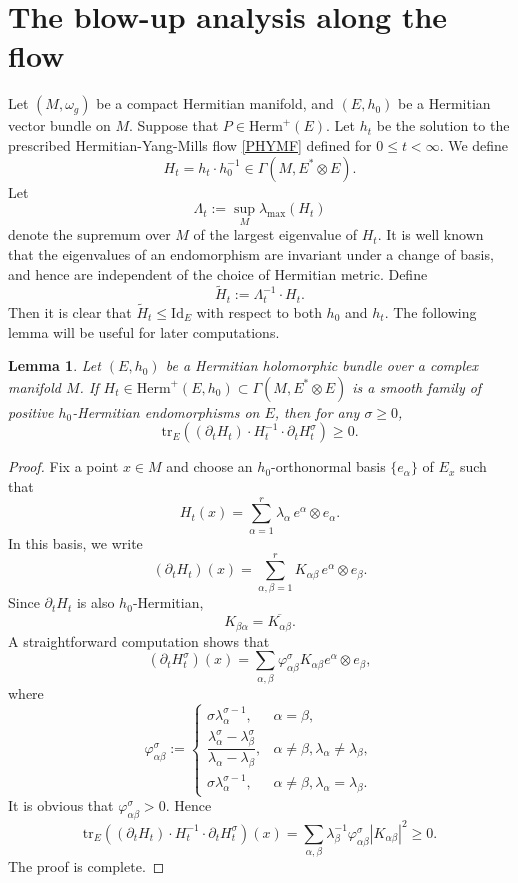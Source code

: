 \documentclass[12pt, reqno]{amsart}
\theoremstyle{plain}
\newtheorem{lemma}[thm]{Lemma}
\theoremstyle{definition}
\newcommand{\elemma}{\end{lemma}}
\newcommand{\blemma}{\begin{lemma}}
\renewcommand{\phi}{\varphi}
\newcommand{\beq}{\begin{equation}}
\newcommand{\eeq}{\end{equation}}
\renewcommand{\tilde}{\widetilde}
\newcommand{\ts}{\otimes}
\renewcommand{\>}{\rightarrow}
\renewcommand{\>}{\rightarrow}
\newcommand{\om}{\omega}
\renewcommand{\tilde}{\widetilde}
\newcommand{\tr}{\mathrm{tr}}
\numberwithin{equation}{section} %
\begin{document}
\baselineskip

\section{The blow-up analysis along the flow}


Let $(M,\om_g)$ be a compact Hermitian manifold, and $(E,h_0)$ be a Hermitian vector bundle on $M$. Suppose that $P\in \mathrm{Herm}^+(E)$.
Let $h_t$ be the solution to the prescribed Hermitian-Yang-Mills flow \eqref{PHYMF} defined for $0\leq t <\infty$.
We define
\beq
H_t=h_t\cdot h_0^{-1}\in\Gamma(M,E^*\ts E).
\eeq
Let  \beq \Lambda_t := \sup_M \lambda_{\max}(H_t)\eeq denote the supremum over $M$ of the largest eigenvalue of $H_t$. It is well known that the eigenvalues of an endomorphism are invariant under a change of basis, and hence are independent of the choice of Hermitian metric.   Define
\beq
\tilde H_t:=\Lambda_t^{-1}\cdot H_t.
\eeq
Then it is clear that $ \tilde H_t\leq \mathrm{Id}_E$ with respect  to both $h_0$ and $h_t$. The following lemma  will be useful for later computations.


\blemma \label{lem pointwise estimate}
Let $(E,h_0)$ be a Hermitian holomorphic  bundle over a complex manifold $M$.
If $H_t\in\mathrm{Herm}^+(E,h_0)\subset \Gamma(M,E^*\ts E)$ is a smooth family of positive $h_0$-Hermitian endomorphisms  on $E$, then for any $\sigma\geq 0$,
\beq
\tr_E\left( \left(\partial_tH_t\right)\cdot H_t^{-1} \cdot\partial_tH_t^\sigma\right) \geq 0.
\eeq
\elemma

\begin{proof}
Fix a point $x \in M$ and choose an $h_0$-orthonormal basis $\{e_\alpha\}$ of $E_x$ such that
\[
H_t(x) = \sum_{\alpha=1}^r \lambda_\alpha \, e^\alpha \otimes e_\alpha .
\]
In this basis, we write
\[
(\partial_t H_t)(x) = \sum_{\alpha,\beta=1}^r K_{\alpha\beta} \, e^\alpha \otimes e_\beta .
\]
    Since $\partial_tH_t$ is also $h_0$-Hermitian, $$K_{\beta\alpha}=\overline{K_{\alpha\beta}}.$$
    A straightforward computation shows that
    \beq
    \left(\partial_tH_t^\sigma\right)(x)=\sum_{\alpha,\beta}\phi^\sigma_{\alpha\beta}K_{\alpha\beta}e^\alpha\ts e_\beta,
    \eeq
    where \beq
    \phi^{\sigma}_{\alpha\beta}:=
    \begin{cases}
        \sigma \lambda_\alpha^{\sigma-1}, & \alpha=\beta,\\[3pt]
        \dfrac{\lambda_\alpha^\sigma-\lambda_\beta^\sigma}{\lambda_\alpha-\lambda_\beta}, &  \alpha\ne \beta, \lambda_\alpha\neq \lambda_\beta ,\\[3pt]
        \sigma \lambda_\alpha^{\sigma-1}, &  \alpha\ne \beta, \lambda_\alpha= \lambda_\beta.
    \end{cases} \label{phisigma}
    \eeq
    It is obvious that $\phi^\sigma_{\alpha\beta}>0$.  Hence
    \beq
    \tr_E\left( \left(\partial_tH_t\right)\cdot H_t^{-1} \cdot\partial_tH_t^\sigma\right)(x)
    =
    \sum_{\alpha,\beta}\lambda_\beta^{-1}\phi^\sigma_{\alpha \beta}|K_{\alpha\beta}|^2
    \ge0.
    \eeq
    The proof is complete.
\end{proof}
\end{document}
